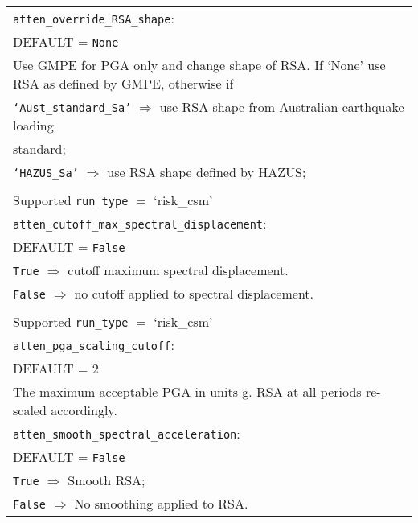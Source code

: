 \begin{tabular}{|p{\textwidth}|}
\hline \vspace{0.1em} \texttt{atten\_override\_RSA\_shape}: \\
DEFAULT = \texttt{None} \\
Use GMPE for PGA only and change shape of RSA. If `None' use RSA
as defined by GMPE, otherwise if\\
 \hspace{0.5em} \texttt{`Aust\_standard\_Sa'} $\Rightarrow$
use RSA shape from Australian earthquake loading \\
\hspace{11em} standard; \\
 \hspace{0.5em} \texttt{`HAZUS\_Sa'}  $\Rightarrow$ use RSA shape defined by HAZUS;\\
\\
Supported \texttt{run\_type} $=$ `risk\_csm' \\
\hline \vspace{0.1em} \texttt{atten\_cutoff\_max\_spectral\_displacement}: \\
DEFAULT = \texttt{False} \\
\hspace{0.5em} \texttt{True} $\Rightarrow$ cutoff maximum spectral displacement. \\
\hspace{0.5em} \texttt{False} $\Rightarrow$ no cutoff applied to spectral displacement. \\
\\
Supported \texttt{run\_type} $=$ `risk\_csm' \\
\hline \vspace{0.1em} \texttt{atten\_pga\_scaling\_cutoff}: \\
DEFAULT = 2 \\
The maximum acceptable PGA in units g. RSA at all periods re-scaled accordingly.      \\
\hline \vspace{0.1em}
\texttt{atten\_smooth\_spectral\_acceleration}: \\
DEFAULT = \texttt{False} \\
\hspace{0.5em} \texttt{True} $\Rightarrow$  Smooth RSA; \\
\hspace{0.5em} \texttt{False} $\Rightarrow$  No smoothing applied to RSA. \\
\hline
 \end{tabular}

